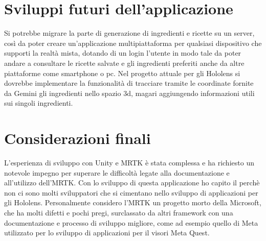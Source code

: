 \section{Sviluppi futuri dell'applicazione}
Si potrebbe migrare la parte di generazione di ingredienti e ricette su un server, così da poter creare un'applicazione multipiattaforma per qualsiasi dispositivo che supporti la realtà mista, dotando di un login l'utente in modo tale da poter andare a consultare le ricette salvate e gli ingredienti preferiti anche da altre piattaforme come smartphone o pc. Nel progetto attuale per gli Hololens si dovrebbe implementare la funzionalità di tracciare tramite le coordinate fornite da Gemini gli ingredienti nello spazio 3d, magari aggiungendo informazioni utili sui singoli ingredienti.

\section{Considerazioni finali}
L'esperienza di sviluppo con Unity e MRTK è stata complessa e ha richiesto un notevole impegno per superare le difficoltà legate alla documentazione e all'utilizzo dell'MRTK. Con lo sviluppo di questa applicazione ho capito il perchè non ci sono molti sviluppatori che si cimentano nello sviluppo di applicazioni per gli Hololens. Personalmente considero l'MRTK un progetto morto della Microsoft, che ha molti difetti e pochi pregi, surclassato da altri framework con una documentazione e processo di sviluppo migliore, come ad esempio quello di Meta utilizzato per lo sviluppo di applicazioni per il visori Meta Quest.